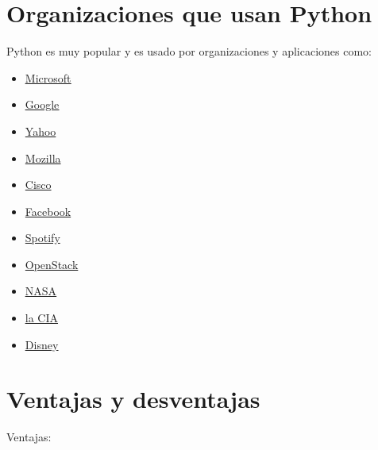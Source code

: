 \documentclass{report}
\begin{document}
\section{Organizaciones que usan Python}

Python es muy popular y es usado por organizaciones y aplicaciones como:

\begin{itemize}
  \item \href{https://www.microsoft.com/en-us/}{\underline{Microsoft}}

  \item \href{https://www.google.com}{\underline{Google}}
  
  \item \href{https://www.yahoo.com}{Yahoo}
  
  \item \href{https://www.mozilla.org/en-US/}{Mozilla}
  
  \item \href{https://www.cisco.com}{Cisco}
  
  \item \href{https://www.facebook.com}{Facebook}
  
  \item \href{https://www.spotify.com}{Spotify}
  
  \item \href{https://www.openstack.org}{OpenStack}

  \item \href{https://www.nasa.gov}{\underline{NASA}}
  
  \item \href{https://www.cia.gov}{\underline{la CIA}}
  
  \item \href{https://www.disney.com}{\underline{Disney}}
  
\end{itemize}

\section{Ventajas y desventajas}

Ventajas:
\end{document}
